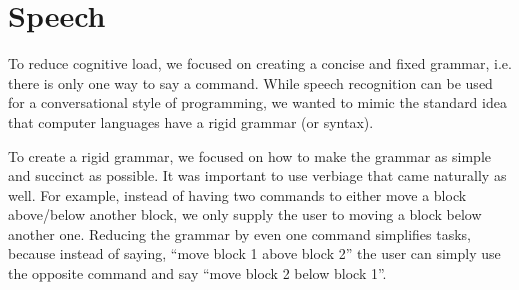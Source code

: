 \documentclass[]{article}
\begin{document}
\section{Speech}


To reduce cognitive load, we focused on creating a concise and fixed grammar, i.e. there is only one way to say a command. While speech 
recognition can be used for a conversational style of programming, we wanted to mimic the standard idea that computer languages have a rigid grammar (or syntax). 

To create a rigid grammar, we focused on how to make the grammar as simple and succinct as possible. 
It was important to use verbiage that came naturally as well. 
For example, instead of having two commands to either move a block above/below another block, we only supply the user to moving a block below another one. 
Reducing the grammar by even one command simplifies tasks, because instead of saying, ``move block 1 above block 2'' the user can simply use the opposite command and say ``move block 2 below block 1''.

\end{document}
